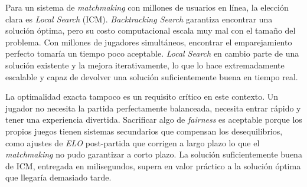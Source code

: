 \documentclass[11pt]{article}
\begin{document}
\begin{enumerate}
  \vspace{0.5em}

  Para un sistema de \textit{matchmaking} con millones de usuarios en línea, la elección clara es
  \textit{Local Search} (ICM). \textit{Backtracking Search} garantiza encontrar una solución
  óptima, pero su costo computacional escala muy mal con el tamaño del problema. Con millones de
  jugadores simultáneos, encontrar el emparejamiento perfecto tomaría un tiempo poco aceptable.
  \textit{Local Search} en cambio parte de una solución existente y la mejora iterativamente, lo
  que lo hace extremadamente escalable y capaz de devolver una solución suficientemente buena en
  tiempo real.

  La optimalidad exacta tampoco es un requisito crítico en este contexto. Un jugador no necesita
  la partida perfectamente balanceada, necesita entrar rápido y tener una experiencia divertida.
  Sacrificar algo de \textit{fairness} es aceptable porque los propios juegos tienen sistemas
  secundarios que compensan los desequilibrios, como ajustes de \textit{ELO} post-partida que
  corrigen a largo plazo lo que el \textit{matchmaking} no pudo garantizar a corto plazo. La
  solución suficientemente buena de ICM, entregada en milisegundos, supera en valor práctico a
  la solución óptima que llegaría demasiado tarde.

\end{enumerate}
\end{document}
